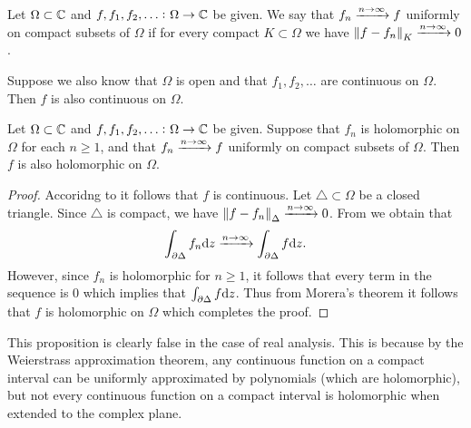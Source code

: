 \documentclass[11pt,a4paper]{article}
\begin{document}
\begin{definition}
  Let $\Omega \subset \mathbb{C}$ and $f,f_1,f_2,\dots \colon \Omega \to \mathbb{C}$ be given.
  We say that $f_n \xrightarrow{n \to \infty} f$ uniformly on compact subsets of
  $\Omega$ if for every compact $K \subset \Omega$ we have
  $\left\lVert f - f_n\right\rVert_{K} \xrightarrow{n \to \infty} 0$.
\end{definition}
\begin{remark}
  \label{rmk:uniform-convergence-continuity}
  Suppose we also know that $\Omega$ is open and that $f_1,f_2,\dots$
  are continuous on $\Omega$.
  Then $f$ is also continuous on $\Omega$.
\end{remark}

\begin{proposition}
  \label{prop:uconvergence-preserves-holomorphicity}
  Let $\Omega \subset \mathbb{C}$ and $f,f_1,f_2,\dots \colon \Omega \to \mathbb{C}$ be given.
  Suppose that $f_n$ is holomorphic on $\Omega$ for each $n \geq 1$,
  and that $f_n \xrightarrow{n \to \infty} f$ uniformly on compact subsets of
  $\Omega$.
  Then $f$ is also holomorphic on $\Omega$.
\end{proposition}
\begin{proof}
  Accoridng to  it follows that
  $f$ is continuous.
  Let $\triangle \subset \Omega$ be a closed triangle.
  Since $\triangle$ is compact,
  we have $\left\lVert f - f_n\right\rVert_{\Delta} \xrightarrow{n \to \infty} 0$.
  From  we obtain that
  \[
    \int_{\partial \Delta} f_n \mathrm{d} z \xrightarrow{n \to \infty} \int_{\partial \Delta} f \mathrm{d} z.
  \]
  However, since $f_n$ is holomorphic for $n \geq 1$,
  it follows that every term in the sequence is $0$ which implies
  that $\int_{\partial \Delta} f \mathrm{d} z$.
  Thus from Morera's theorem it follows that $f$ is holomorphic on $\Omega$
  which completes the proof.
\end{proof}
\begin{remark}
  This proposition is clearly false in the case of real analysis.
  This is because by the Weierstrass approximation theorem,
  any continuous function on a compact interval can be uniformly approximated
  by polynomials (which are holomorphic), but not every continuous function
  on a compact interval is holomorphic when extended to the complex plane.
\end{remark}
\end{document}
